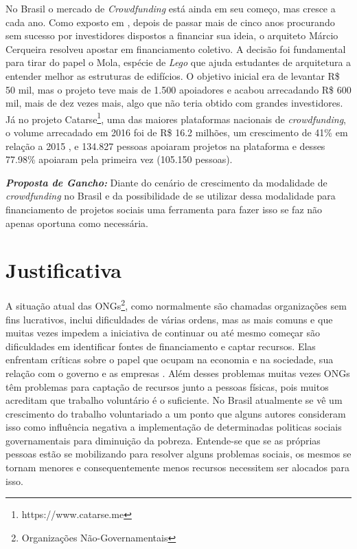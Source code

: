 No Brasil o mercado de \emph{Crowdfunding} está ainda em seu começo, mas cresce a cada ano. Como exposto em \cite{globo-financiamento}, depois de passar mais de cinco anos procurando sem sucesso por investidores dispostos a financiar sua ideia, o arquiteto Márcio Cerqueira resolveu apostar em financiamento coletivo. A decisão foi fundamental para tirar do papel o Mola, espécie de \emph{Lego} que ajuda estudantes de arquitetura a entender melhor as estruturas de edifícios. O objetivo inicial era de levantar R\$ 50 mil, mas o projeto teve mais de 1.500 apoiadores e acabou arrecadando R\$ 600 mil, mais de dez vezes mais, algo que não teria obtido com grandes investidores. Já no projeto Catarse\footnote{https://www.catarse.me}, uma das maiores plataformas nacionais de \emph{crowdfunding}, o volume arrecadado em 2016 foi de R\$ 16.2 milhões, um crescimento de 41\% em relação a 2015 \cite{catarse-retrospectiva2016}, e 134.827 pessoas apoiaram projetos na plataforma e desses 77.98\% apoiaram pela primeira vez (105.150 pessoas).

\textbf{\textit{Proposta de Gancho:}} Diante do cenário de crescimento da modalidade de \emph{crowdfunding} no Brasil e da possibilidade de se utilizar dessa modalidade para financiamento de projetos sociais uma ferramenta para fazer isso se faz não apenas oportuna como necessária.



\section{Justificativa}
A situação atual das ONGs\footnote{Organizações Não-Governamentais}, como normalmente são chamadas organizações sem fins lucrativos, inclui dificuldades de várias ordens, mas as mais comuns e que muitas vezes impedem a iniciativa de continuar ou até mesmo começar são dificuldades em identificar fontes de financiamento e captar recursos. Elas enfrentam críticas sobre o papel que ocupam na economia e na sociedade, sua relação com o governo e as empresas \cite{GOUVEIA2007}. Além desses problemas muitas vezes ONGs têm problemas para captação de recursos junto a pessoas físicas, pois muitos acreditam que trabalho voluntário é o suficiente. No Brasil atualmente se vê um crescimento do trabalho voluntariado a um ponto que alguns autores \cite{fagundes2012repercussoes} consideram isso como influência negativa a implementação de determinadas politicas sociais governamentais para diminuição da pobreza. Entende-se que se as próprias pessoas estão se mobilizando para resolver alguns problemas sociais, os mesmos se tornam menores e consequentemente menos recursos necessitem ser alocados para isso.

